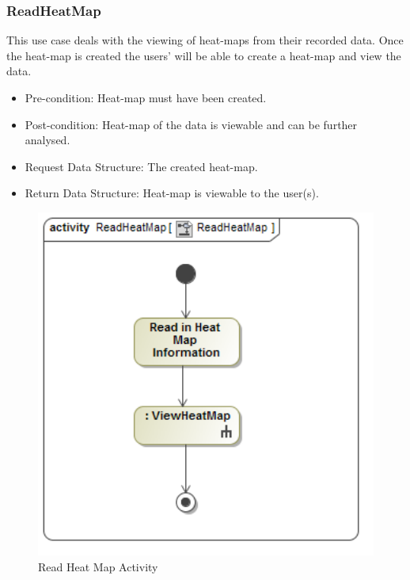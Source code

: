 	\subsubsection{ReadHeatMap}
	This use case deals with the viewing of heat-maps from their recorded data. Once the heat-map is created the users' will be able to create a heat-map and view the data.
	\begin{itemize}
		\item Pre-condition: Heat-map must have been created.
		\item Post-condition: Heat-map of the data is viewable and can be further analysed.
		\item Request Data Structure: The created heat-map.
		\item Return Data Structure: Heat-map is viewable to the user(s).
	\end{itemize}
	
	\begin{figure}[!ht]
		\centering
		\includegraphics[scale=0.5,width=15cm,keepaspectratio]{Diagrams/Activity_Diagram__ReadHeatMap__ReadHeatMap.png}
		\caption{Read Heat Map Activity}
	\end{figure}
	
